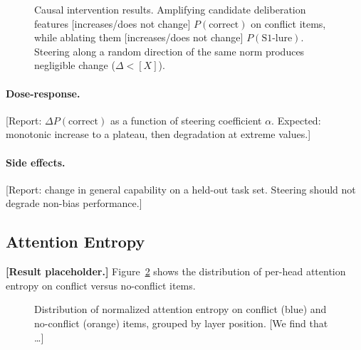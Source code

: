 \begin{figure}[t]
\centering
\caption{Causal intervention results.  Amplifying candidate deliberation
  features [increases/does not change] $P(\text{correct})$ on conflict
  items, while ablating them [increases/does not change]
  $P(\text{S1-lure})$.  Steering along a random direction of the same norm
  produces negligible change ($\Delta < [X]$).}
\label{fig:causal}
\end{figure}

\paragraph{Dose-response.}  [Report: $\Delta P(\text{correct})$ as a
function of steering coefficient $\alpha$.  Expected: monotonic increase
to a plateau, then degradation at extreme values.]

\paragraph{Side effects.}  [Report: change in general capability on a
held-out task set.  Steering should not degrade non-bias performance.]

\subsection{Attention Entropy}
\label{sec:results_attention}

\textbf{[Result placeholder.]}  Figure~\ref{fig:entropy} shows the
distribution of per-head attention entropy on conflict versus no-conflict
items.

\begin{figure}[t]
\centering
\caption{Distribution of normalized attention entropy on conflict (blue) and
  no-conflict (orange) items, grouped by layer position.  [We find that
  \ldots]}
\label{fig:entropy}
\end{figure}

